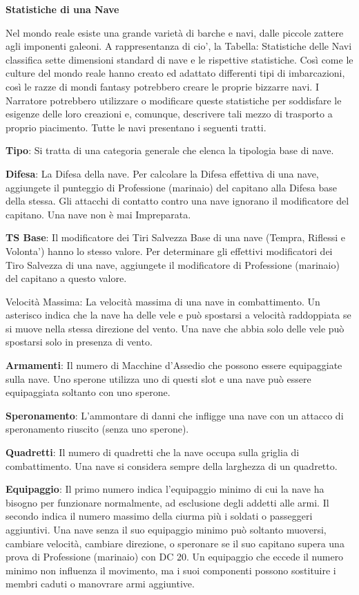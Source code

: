 \documentclass[a4paper,11pt,twoside,openany]{book}
\begin{document}
{\textbf{Statistiche di una Nave}

Nel mondo reale esiste una grande varietà di barche e navi, dalle piccole zattere agli imponenti galeoni. A rappresentanza di cio', la Tabella: Statistiche delle Navi classifica sette dimensioni standard di nave e le rispettive statistiche. Così come le culture del mondo reale hanno creato ed adattato differenti tipi di imbarcazioni, così le razze di mondi fantasy potrebbero creare le proprie bizzarre navi.
I Narratore potrebbero utilizzare o modificare queste statistiche per soddisfare le esigenze delle loro creazioni e, comunque, descrivere tali mezzo di trasporto a proprio piacimento. Tutte le navi presentano i seguenti tratti.

\textbf{Tipo}: Si tratta di una categoria generale che elenca la tipologia base di nave.

\textbf{Difesa}: La Difesa della nave. Per calcolare la Difesa effettiva di una nave, aggiungete il punteggio di Professione (marinaio) del capitano alla Difesa base della stessa. Gli attacchi di contatto contro una nave ignorano il modificatore del capitano. Una nave non è mai Impreparata.

\textbf{TS Base}: Il modificatore dei Tiri Salvezza Base di una nave (Tempra, Riflessi e Volonta') hanno lo stesso valore. Per determinare gli effettivi modificatori dei Tiro Salvezza di una nave, aggiungete il modificatore di Professione (marinaio) del capitano a questo valore.

Velocità Massima: La velocità massima di una nave in combattimento. Un asterisco indica che la nave ha delle vele e può spostarsi a velocità raddoppiata se si muove nella stessa direzione del vento. Una nave che abbia solo delle vele può spostarsi solo in presenza di vento.

\textbf{Armamenti}: Il numero di Macchine d'Assedio che possono essere equipaggiate sulla nave. Uno sperone utilizza uno di questi slot e una nave può essere equipaggiata soltanto con uno sperone.

\textbf{Speronamento}: L'ammontare di danni che infligge una nave con un attacco di speronamento riuscito (senza uno sperone).

\textbf{Quadretti}: Il numero di quadretti che la nave occupa sulla griglia di combattimento. Una nave si considera sempre della larghezza di un quadretto.

\textbf{Equipaggio}: Il primo numero indica l'equipaggio minimo di cui la nave ha bisogno per funzionare normalmente, ad esclusione degli addetti alle armi. Il secondo indica il numero massimo della ciurma più i soldati o passeggeri aggiuntivi. Una nave senza il suo equipaggio minimo può soltanto muoversi, cambiare velocità, cambiare direzione, o speronare se il suo capitano supera una prova di Professione (marinaio) con DC 20.
Un equipaggio che eccede il numero minimo non influenza il movimento, ma i suoi componenti possono sostituire i membri caduti o manovrare armi aggiuntive.

}
\end{document}
